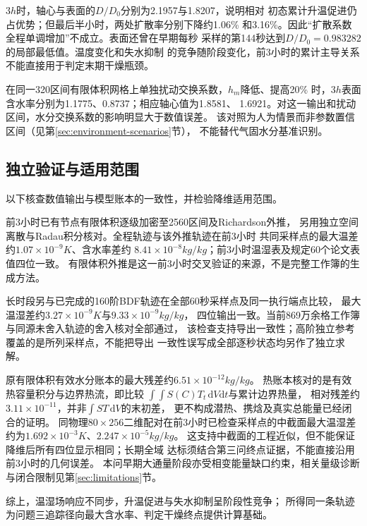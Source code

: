 $3\unit{h}$时，轴心与表面的$D/D_0$分别为2.1957与1.8207，说明相对
初态累计升温促进仍占优势；但最后半小时，两处扩散率分别下降约1.06\%
和3.16\%。因此“扩散系数全程单调增加”不成立。表面还曾在早期每秒
采样的第144秒达到$D/D_0=0.983282$的局部最低值。温度变化和失水抑制
的竞争随阶段变化，前3小时的累计主导关系不能直接用于判定末期干燥瓶颈。

在同一320区间有限体积网格上单独扰动交换系数，$h_m$降低、提高20\%
时，$3\unit{h}$表面含水率分别为1.1775、0.8737；相应轴心值为1.8581、
1.6921。对这一输出和扰动区间，水分交换系数的影响明显大于数值误差。
该对照为人为情景而非参数置信区间（见第\ref{sec:environment-scenarios}节），
不能替代气固水分基准识别\cite{dasilva2014,adrover2020}。

\subsection{独立验证与适用范围}
以下核查数值输出与模型账本的一致性，并检验降维适用范围。

前3小时已有节点有限体积逐级加密至2560区间及Richardson外推，
另用独立空间离散与Radau积分核对。全程轨迹与该外推轨迹在前3小时
共同采样点的最大温差约$1.07\times10^{-9}\unit{K}$、含水率差约
$8.41\times10^{-8}\unit{kg/kg}$；前3小时温湿表及规定60个论文表值四位一致。
有限体积外推是这一前3小时交叉验证的来源，不是完整工作簿的生成方法。

长时段另与已完成的160阶BDF轨迹在全部60秒采样点及同一执行端点比较，
最大温湿差约$3.27\times10^{-9}\unit{K}$与$9.33\times10^{-9}\unit{kg/kg}$，
四位输出一致。当前869万余格工作簿与同源未舍入轨迹的舍入核对全部通过，
该检查支持导出一致性；高阶独立参考覆盖的是所列采样点，不能把导出
一致性误写成全部逐秒状态均另作了独立求解。

原有限体积有效水分账本的最大残差约$6.51\times10^{-12}\unit{kg/kg}$。
热账本核对的是有效热容量积分与边界热流，即比较
$\int\!\int S(C)T_t\,\mathrm dV\mathrm dt$与累计边界热量，
相对残差约$3.11\times10^{-11}$，并非$\int ST\,\mathrm dV$的末初差，
更不构成潜热、携焓及真实总能量已经闭合的证明。
同物理$80\times256$二维配对在前3小时已检查采样点的中截面最大温湿差
约为$1.692\times10^{-3}\unit{K}$、$2.247\times10^{-5}\unit{kg/kg}$。
这支持中截面的工程近似，但不能保证降维后所有四位显示相同；长期全域
达标须结合第三问终点证据，不能直接沿用前3小时的几何误差。
本问早期大通量阶段亦受相变能量缺口约束，相关量级诊断与闭合限制见第\ref{sec:limitations}节。

综上，温湿场响应不同步，升温促进与失水抑制呈阶段性竞争；
所得同一条轨迹为问题三追踪径向最大含水率、判定干燥终点提供计算基础。
\FloatBarrier
\endgroup
